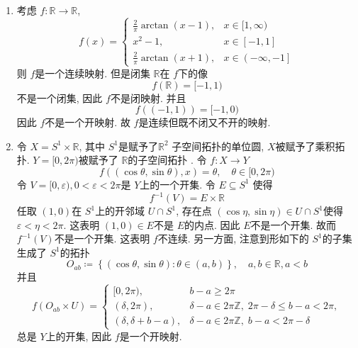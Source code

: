 \documentclass[../main.tex]{subfiles}
\begin{document}
\begin{solution}
    \begin{enumerate}
        \item 考虑 \(  f:\mathbb{R} \to \mathbb{R}   \), \[
        f\left( x \right)= \begin{cases} \frac{2 }{ \pi }\arctan \left( x-1 \right),& x \in [1,\infty)\\ 
         x^{2}-1,& x\in \left[ -1,1 \right]\\ 
          \frac{2 }{ \pi }\arctan \left( x+ 1 \right), & x \in \left( -\infty,-1 \right]       \end{cases}  
        \] 则 \(  f  \)是一个连续映射. 但是闭集 \(  \mathbb{R}   \)在 \(  f  \)下的像   \[
        f\left( \mathbb{R}  \right)=[-1,1) 
        \]不是一个闭集, 因此 \(  f  \)不是闭映射. 并且 \[
        f\left( \left( -1,1 \right)  \right)= [-1,0) 
        \]  因此 \(  f  \)不是一个开映射. 故 \(  f  \)是连续但既不闭又不开的映射.  
        \item  令 \(  X= S^{1}\times \mathbb{R}   \), 其中 \(  S^{1}  \)是赋予了\(  \mathbb{R} ^{2}  \) 子空间拓扑的单位圆, \(  X  \)被赋予了乘积拓扑.  \(  Y= [0,2 \pi)  \)被赋予了 \(  \mathbb{R}   \)的子空间拓扑 . 令 \(  f:X\to Y  \) \[
        f\left( \left( \cos  \theta ,\sin  \theta  \right), x  \right)=  \theta  , \quad  \theta \in [0,2 \pi)
        \]  令 \(  V= [0, \varepsilon )  , 0<  \varepsilon < 2 \pi\)是  \(  Y  \)上的一个开集. 令 \(  E  \subseteq S^{1}\) 使得 \[
        f^{-1} \left( V \right)= E\times \mathbb{R}  
        \] 任取 \(  \left( 1,0 \right)   \)在 \(  S^{1}  \)上的开邻域 \(  U \cap S^{1} \), 存在点 \(  \left( \cos \eta , \sin \eta  \right)\in U\cap S^{1}   \)使得 \(   \varepsilon < \eta < 2 \pi  \).     这表明 \(  \left( 1,0 \right)\in E   \)不是 \(  E  \)的内点. 因此 \(  E  \)不是一个开集. 故而 \(  f^{-1} \left( V \right)   \)不是一个开集. 这表明 \(  f  \)不连续.   另一方面, 注意到形如下的 \(  S^{1}  \)的子集生成了 \(  S^{1}  \)的拓扑 \[
O_{ab}\coloneqq         \left\{ \left( \cos  \theta , \sin  \theta  \right):  \theta  \in \left( a,b \right)   \right\},\quad a,b\in \mathbb{R} ,a< b
        \]       并且 \[
        f\left( O_{ab}\times U  \right)=  \begin{cases} [0,2 \pi),& b-a\ge 2 \pi\\ 
         ( \delta ,2 \pi),&  \delta -a\in 2 \pi\mathbb{Z} , \; 2 \pi- \delta \le b-a< 2 \pi,\\ 
          ( \delta , \delta + b-a),&   \delta -a\in 2 \pi\mathbb{Z} , \; b-a< 2 \pi- \delta  \end{cases} 
        \]总是 \(  Y  \)上的开集, 因此 \(  f  \)是一个开映射.
        

\end{enumerate}
\end{solution}
\end{document}
